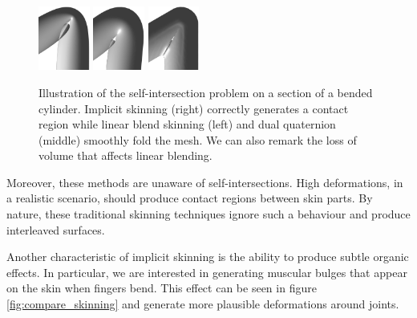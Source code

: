 \documentclass[a4paper,10pt]{article}
\begin{document}
\begin{multicols}{2}
\begin{figure}[H]
\centering
\includegraphics[width=0.15\textwidth]{figs/cylinder_linear}
\includegraphics[width=0.15\textwidth]{figs/cylinder_dualquat}
\includegraphics[width=0.15\textwidth]{figs/cylinder_implicit}
\caption{Illustration of the self-intersection problem on a section of a bended cylinder.
Implicit skinning (right) correctly generates a contact region while linear blend skinning (left) and dual quaternion (middle) smoothly fold the mesh.
We can also remark the loss of volume that affects linear blending.}
\end{figure}

Moreover, these methods are unaware of self-intersections.
High deformations, in a realistic scenario, should produce contact regions between skin parts.
By nature, these traditional skinning techniques ignore such a behaviour and produce interleaved surfaces.

Another characteristic of implicit skinning is the ability to produce subtle organic effects.
In particular, we are interested in generating muscular bulges that appear on the skin when fingers bend.
This effect can be seen in figure \ref{fig:compare_skinning} and generate more plausible deformations around joints.


\end{multicols}
\end{document}
